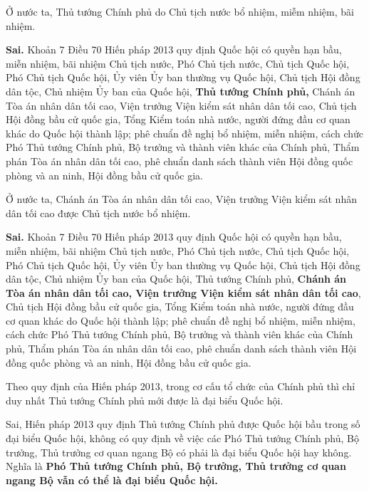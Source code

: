 \begin{ques}
Ở nước ta, Thủ tướng Chính phủ do Chủ tịch nước bổ nhiệm, miễm nhiệm, bãi nhiệm.
\end{ques}
\begin{ans}
\textbf{Sai.} Khoản 7 Điều 70 Hiến pháp 2013 quy định Quốc hội có quyền hạn bầu, miễn nhiệm, bãi nhiệm Chủ tịch nước, Phó Chủ tịch nước, Chủ tịch Quốc hội, Phó Chủ tịch Quốc hội, Ủy viên Ủy ban thường vụ Quốc hội, Chủ tịch Hội đồng dân tộc, Chủ nhiệm Ủy ban của Quốc hội, \textbf{Thủ tướng Chính phủ,} Chánh án Tòa án nhân dân tối cao, Viện trưởng Viện kiểm sát nhân dân tối cao, Chủ tịch Hội đồng bầu cử quốc gia, Tổng Kiểm toán nhà nước, người đứng đầu cơ quan khác do Quốc hội thành lập; phê chuẩn đề nghị bổ nhiệm, miễn nhiệm, cách chức Phó Thủ tướng Chính phủ, Bộ trưởng và thành viên khác của Chính phủ, Thẩm phán Tòa án nhân dân tối cao, phê chuẩn danh sách thành viên Hội đồng quốc phòng và an ninh, Hội đồng bầu cử quốc gia.
\end{ans}

\begin{ques}
Ở nước ta, Chánh án Tòa án nhân dân tối cao, Viện trưởng Viện kiểm sát nhân dân tối cao được Chủ tịch nước bổ nhiệm.
\end{ques}
\begin{ans}
\textbf{Sai.} Khoản 7 Điều 70 Hiến pháp 2013 quy định Quốc hội có quyền hạn bầu, miễn nhiệm, bãi nhiệm Chủ tịch nước, Phó Chủ tịch nước, Chủ tịch Quốc hội, Phó Chủ tịch Quốc hội, Ủy viên Ủy ban thường vụ Quốc hội, Chủ tịch Hội đồng dân tộc, Chủ nhiệm Ủy ban của Quốc hội, Thủ tướng Chính phủ, \textbf{Chánh án Tòa án nhân dân tối cao, Viện trưởng Viện kiểm sát nhân dân tối cao}, Chủ tịch Hội đồng bầu cử quốc gia, Tổng Kiểm toán nhà nước, người đứng đầu cơ quan khác do Quốc hội thành lập; phê chuẩn đề nghị bổ nhiệm, miễn nhiệm, cách chức Phó Thủ tướng Chính phủ, Bộ trưởng và thành viên khác của Chính phủ, Thẩm phán Tòa án nhân dân tối cao, phê chuẩn danh sách thành viên Hội đồng quốc phòng và an ninh, Hội đồng bầu cử quốc gia.
\end{ans}

\begin{ques}
Theo quy định của Hiến pháp 2013, trong cơ cấu tổ chức của Chính phủ thì chỉ duy nhất Thủ tướng Chính phủ mới được là đại biểu Quốc hội.
\end{ques}
\begin{ans}
Sai, Hiến pháp 2013 quy định Thủ tướng Chính phủ được Quốc hội bầu trong số đại biểu Quốc hội, không có quy định về việc các Phó Thủ tướng Chính phủ, Bộ trưởng, Thủ trưởng cơ quan ngang Bộ có phải là đại biểu Quốc hội hay không. Nghĩa là \textbf{Phó Thủ tướng Chính phủ, Bộ trưởng, Thủ trưởng cơ quan ngang Bộ vẫn có thể là đại biểu Quốc hội.}
\end{ans}

